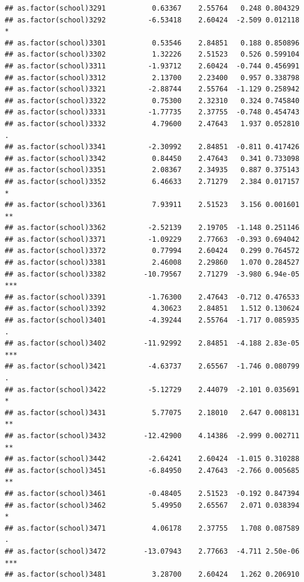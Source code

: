 \documentclass[ignorenonframetext,]{beamer}
\begin{document}
\begin{frame}[fragile]{}
\begin{verbatim}
## as.factor(school)3291           0.63367    2.55764   0.248 0.804329    
## as.factor(school)3292          -6.53418    2.60424  -2.509 0.012118 *  
## as.factor(school)3301           0.53546    2.84851   0.188 0.850896    
## as.factor(school)3302           1.32226    2.51523   0.526 0.599104    
## as.factor(school)3311          -1.93712    2.60424  -0.744 0.456991    
## as.factor(school)3312           2.13700    2.23400   0.957 0.338798    
## as.factor(school)3321          -2.88744    2.55764  -1.129 0.258942    
## as.factor(school)3322           0.75300    2.32310   0.324 0.745840    
## as.factor(school)3331          -1.77735    2.37755  -0.748 0.454743    
## as.factor(school)3332           4.79600    2.47643   1.937 0.052810 .  
## as.factor(school)3341          -2.30992    2.84851  -0.811 0.417426    
## as.factor(school)3342           0.84450    2.47643   0.341 0.733098    
## as.factor(school)3351           2.08367    2.34935   0.887 0.375143    
## as.factor(school)3352           6.46633    2.71279   2.384 0.017157 *  
## as.factor(school)3361           7.93911    2.51523   3.156 0.001601 ** 
## as.factor(school)3362          -2.52139    2.19705  -1.148 0.251146    
## as.factor(school)3371          -1.09229    2.77663  -0.393 0.694042    
## as.factor(school)3372           0.77994    2.60424   0.299 0.764572    
## as.factor(school)3381           2.46008    2.29860   1.070 0.284527    
## as.factor(school)3382         -10.79567    2.71279  -3.980 6.94e-05 ***
## as.factor(school)3391          -1.76300    2.47643  -0.712 0.476533    
## as.factor(school)3392           4.30623    2.84851   1.512 0.130624    
## as.factor(school)3401          -4.39244    2.55764  -1.717 0.085935 .  
## as.factor(school)3402         -11.92992    2.84851  -4.188 2.83e-05 ***
## as.factor(school)3421          -4.63737    2.65567  -1.746 0.080799 .  
## as.factor(school)3422          -5.12729    2.44079  -2.101 0.035691 *  
## as.factor(school)3431           5.77075    2.18010   2.647 0.008131 ** 
## as.factor(school)3432         -12.42900    4.14386  -2.999 0.002711 ** 
## as.factor(school)3442          -2.64241    2.60424  -1.015 0.310288    
## as.factor(school)3451          -6.84950    2.47643  -2.766 0.005685 ** 
## as.factor(school)3461          -0.48405    2.51523  -0.192 0.847394    
## as.factor(school)3462           5.49950    2.65567   2.071 0.038394 *  
## as.factor(school)3471           4.06178    2.37755   1.708 0.087589 .  
## as.factor(school)3472         -13.07943    2.77663  -4.711 2.50e-06 ***
## as.factor(school)3481           3.28700    2.60424   1.262 0.206910    

\end{verbatim}
\end{frame}
\end{document}
